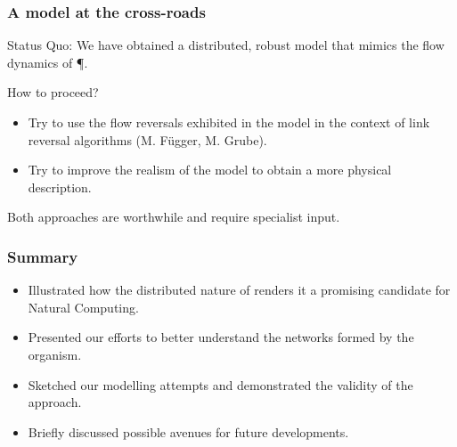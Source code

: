 \documentclass[	hyperref={pdfpagelabels=false}, xcolor=dvipsnames,
		11pt]{beamer}
\begin{document}
\begin{frame}
	\frametitle{A model at the cross-roads}

	\begin{block}{Status Quo:}
		We have obtained a distributed, robust model that mimics the flow dynamics of \P.
	\end{block}
	\begin{alertblock}{How to proceed?}
		\begin{itemize}
			\item Try to use the flow reversals exhibited in the model in the context of link reversal algorithms (M. Függer, M. Grube).
			\item Try to improve the realism of the model to obtain a more physical description.
		\end{itemize}
	\end{alertblock}

	Both approaches are worthwhile and require specialist input.
\end{frame}

\begin{frame}
	\frametitle{Summary}

	\begin{itemize}
		\item Illustrated how the distributed nature of \Pp renders it a promising candidate for Natural Computing.
		\item Presented our efforts to better understand the networks formed by the organism.
		\item Sketched our modelling attempts and demonstrated the validity of the approach.
		\item Briefly discussed possible avenues for future developments.
	\end{itemize}
\end{frame}



\end{document}
